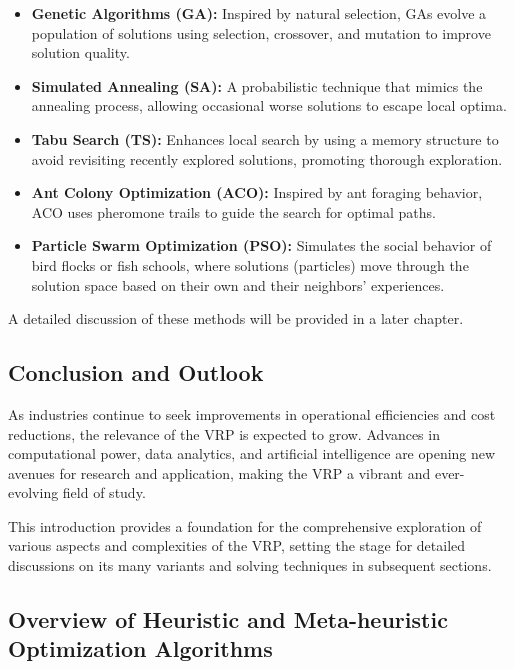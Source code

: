 \documentclass[
]{article}
\begin{document}
\begin{itemize}
  \item \textbf{Genetic Algorithms (GA):} Inspired by natural selection, GAs evolve a population of solutions using selection, crossover, and mutation to improve solution quality.
  \item \textbf{Simulated Annealing (SA):} A probabilistic technique that mimics the annealing process, allowing occasional worse solutions to escape local optima.
  \item \textbf{Tabu Search (TS):} Enhances local search by using a memory structure to avoid revisiting recently explored solutions, promoting thorough exploration.
  \item \textbf{Ant Colony Optimization (ACO):} Inspired by ant foraging behavior, ACO uses pheromone trails to guide the search for optimal paths.
  \item \textbf{Particle Swarm Optimization (PSO):} Simulates the social behavior of bird flocks or fish schools, where solutions (particles) move through the solution space based on their own and their neighbors' experiences.
\end{itemize}

A detailed discussion of these methods will be provided in a later chapter.




\subsection{Conclusion and Outlook}
As industries continue to seek improvements in operational efficiencies and cost reductions, the relevance of the VRP is expected to grow. Advances in computational power, data analytics, and artificial intelligence are opening new avenues for research and application, making the VRP a vibrant and ever-evolving field of study.

This introduction provides a foundation for the comprehensive exploration of various aspects and complexities of the VRP, setting the stage for detailed discussions on its many variants and solving techniques in subsequent sections.
\newpage

\hypertarget{overview-of-heuristic-and-meta-heuristic-optimization-algorithms}{%
  \subsection{Overview of Heuristic and Meta-heuristic Optimization Algorithms}\label{overview-of-heuristic-and-meta-heuristic-optimization-algorithms}}
\end{document}
